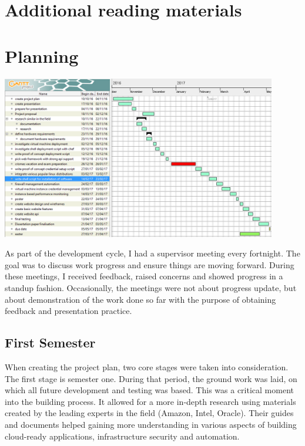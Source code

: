 \documentclass{article}
\begin{document}
\begin{appendices}

\section{Additional reading materials}

\section{Planning}


\begin{center}
	\includegraphics[width=12cm]{gantt.jpg}
\end{center}

As part of the development cycle, I had a supervisor meeting every fortnight. The goal was to discuss work progress and ensure things are moving forward. During these meetings, I received feedback, raised concerns and showed progress in a \gls{standup} fashion. Occasionally, the meetings were not about progress update, but about demonstration of the work done so far with the purpose of obtaining feedback and presentation practice.

\subsection{First Semester}
When creating the project plan, two core stages were taken into consideration. The first stage is semester one. During that period, the ground work was laid, on which all future development and testing was based. This was a critical moment into the building process. It allowed for a more in-depth research using materials created by the leading experts in the field (Amazon, Intel, Oracle). Their guides and documents helped gaining more understanding in various aspects of building cloud-ready applications, infrastructure security and automation.


\end{appendices}
\end{document}
